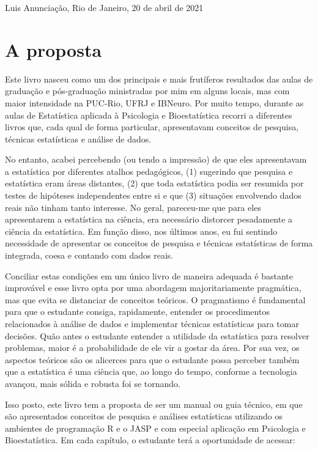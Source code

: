 \documentclass[
]{book}
\begin{document}
Luis Anunciação,
Rio de Janeiro, 20 de abril de 2021

\hypertarget{a-proposta}{%
\section{A proposta}\label{a-proposta}}

Este livro nasceu como um dos principais e mais frutíferos resultados das aulas de graduação e pós-graduação ministradas por mim em alguns locais, mas com maior intensidade na PUC-Rio, UFRJ e IBNeuro. Por muito tempo, durante as aulas de Estatística aplicada à Psicologia e Bioestatística recorri a diferentes livros que, cada qual de forma particular, apresentavam conceitos de pesquisa, técnicas estatísticas e análise de dados.

No entanto, acabei percebendo (ou tendo a impressão) de que eles apresentavam a estatística por diferentes atalhos pedagógicos, (1) sugerindo que pesquisa e estatística eram áreas distantes, (2) que toda estatística podia ser resumida por testes de hipóteses independentes entre si e que (3) situações envolvendo dados reais não tinham tanto interesse. No geral, pareceu-me que para eles apresentarem a estatística na ciência, era necessário distorcer pesadamente a ciência da estatística. Em função disso, nos últimos anos, eu fui sentindo necessidade de apresentar os conceitos de pesquisa e técnicas estatísticas de forma integrada, coesa e contando com dados reais.

Conciliar estas condições em um único livro de maneira adequada é bastante improvável e esse livro opta por uma abordagem majoritariamente pragmática, mas que evita se distanciar de conceitos teóricos. O pragmatismo é fundamental para que o estudante consiga, rapidamente, entender os procedimentos relacionados à análise de dados e implementar técnicas estatísticas para tomar decisões. Quão antes o estudante entender a utilidade da estatística para resolver problemas, maior é a probabilidade de ele vir a gostar da área. Por sua vez, os aspectos teóricos são os alicerces para que o estudante possa perceber também que a estatística é uma ciência que, ao longo do tempo, conforme a tecnologia avançou, mais sólida e robusta foi se tornando.

Isso posto, este livro tem a proposta de ser um manual ou guia técnico, em que são apresentados conceitos de pesquisa e análises estatísticas utilizando os ambientes de programação R e o JASP e com especial aplicação em Psicologia e Bioestatística. Em cada capítulo, o estudante terá a oportunidade de acessar:
\end{document}
